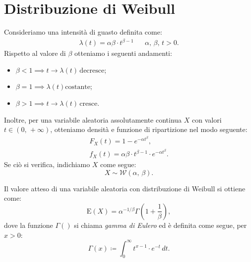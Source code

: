     \section{Distribuzione di Weibull}
        \begin{defn}\label{defn:Distribuzione_Weibull}
            Consideriamo una intensità di guasto definita come:
            \begin{align*}
                \lambda(t) = \alpha\beta \cdot t^{\beta - 1}
                & & \alpha,\, \beta,\, t > 0
            .\end{align*}
            Rispetto al valore di $\beta$ otteniamo i seguenti andamenti:
            \begin{itemize}
                \item $\beta < 1 \implies t \rightarrow \lambda(t)\, \text{decresce}$;
                \item $\beta = 1 \implies \lambda(t) \text{costante}$;
                \item $\beta > 1 \implies t \rightarrow \lambda(t)\, \text{cresce}$.
            \end{itemize}
            Inoltre, per una variabile aleatoria assolutamente continua $X$ con valori $t \in (0,\,+\infty)$, otteniamo densità e funzione di ripartizione nel modo seguente:
            \begin{gather*}
                F_X(t) = 1 - e^{-\alpha t^{\beta}}, \\
                f_X(t) = \alpha\beta \cdot t^{\beta - 1}\cdot e^{-\alpha t^{\beta}}.
            \end{gather*}
            Se ciò si verifica, indichiamo $X$ come segue: \[
                X \sim \mathcal{W}(\alpha,\, \beta)
            .\]
        \end{defn}
        \begin{obsv}
            Il valore atteso di una variabile aleatoria con distribuzione di Weibull si ottiene come: \[
                \text{E}(X) = \alpha ^{-1 /\beta} \Gamma\left(1 + \frac{1}{\beta}\right)
            ,\] dove la funzione $\Gamma()$ si chiama \textit{gamma di Eulero} ed è definita come segue, per $x > 0$: \[
            \Gamma(x) \coloneqq \int_{0}^{\infty} t^{x-1}\cdot e^{-t}\, dt
            .\] 
        \end{obsv}
